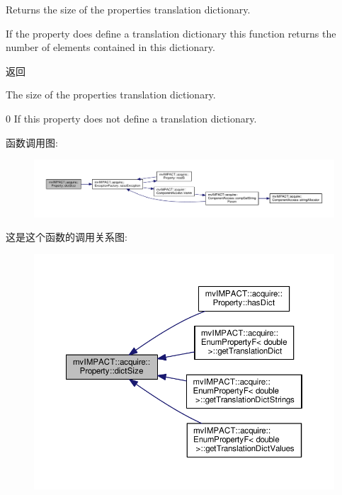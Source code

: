 Returns the size of the properties translation dictionary. 

If the property does define a translation dictionary this function returns the number of elements contained in this dictionary. \begin{DoxyReturn}{返回}

\begin{DoxyItemize}
\item The size of the properties translation dictionary.
\item 0 If this property does not define a translation dictionary. 
\end{DoxyItemize}
\end{DoxyReturn}


函数调用图\+:
\nopagebreak
\begin{figure}[H]
\begin{center}
\leavevmode
\includegraphics[width=350pt]{classmv_i_m_p_a_c_t_1_1acquire_1_1_property_ab47d418329e2422053fec56c8d316f17_cgraph}
\end{center}
\end{figure}




这是这个函数的调用关系图\+:
\nopagebreak
\begin{figure}[H]
\begin{center}
\leavevmode
\includegraphics[width=350pt]{classmv_i_m_p_a_c_t_1_1acquire_1_1_property_ab47d418329e2422053fec56c8d316f17_icgraph}
\end{center}
\end{figure}


